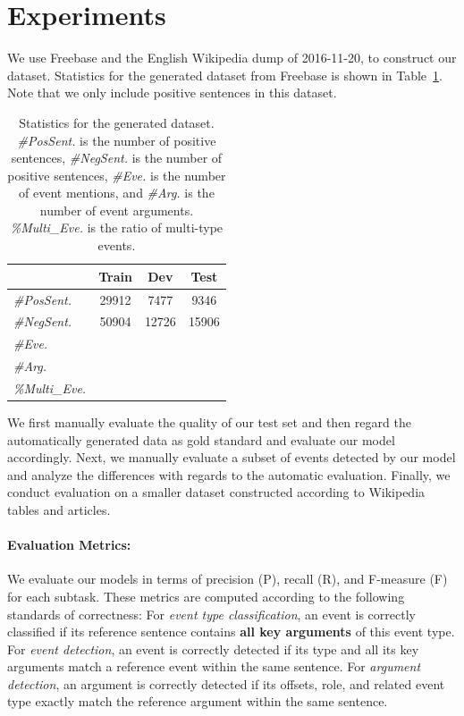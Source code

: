 \section{Experiments}
We use Freebase and the English Wikipedia dump of 2016-11-20, to construct our dataset. Statistics for the generated dataset from Freebase is shown in Table~\ref{statistics}. Note that we only include positive sentences in this dataset. 
\begin{table}
\small
\centering
\begin{tabular}{|l|c|c|c|} \hline
& Train & Dev & Test \\ \hline
\emph{\#PosSent.} & 29912 & 7477 & 9346 \\ \hline
\emph{\#NegSent.} & 50904 & 12726 & 15906  \\ \hline
\emph{\#Eve.} &  &  &  \\ \hline
\emph{\#Arg.} &  &  &  \\ \hline
\emph{\%Multi\_Eve.} &  &  &  \\ \hline
\end{tabular}
\caption{Statistics for the generated dataset. \emph{\#PosSent.} is the number of positive sentences, \emph{\#NegSent.} is the number of positive sentences, \emph{\#Eve.} is the number of event mentions, and \emph{\#Arg.} is the number of event arguments. \emph{\%Multi\_Eve.} is the ratio of multi-type events.
\label{statistics}}
\end{table}

We first manually evaluate the quality of our test set and then regard the automatically generated data as gold standard and evaluate our model accordingly. Next, we manually evaluate a subset of events detected by our model and analyze the differences with regards to the automatic evaluation. Finally, we conduct evaluation on a smaller dataset constructed according to Wikipedia tables and articles. 

\paragraph{Evaluation Metrics:} We evaluate our models in terms of precision (P), recall (R), and F-measure (F) for each subtask. These metrics are computed according to the following standards of correctness: 
For \emph{event type classification}, an event is correctly classified if its reference sentence contains \textbf{all key arguments} of this event type. 
For \emph{event detection}, an event is correctly detected if its type and all its key arguments match a reference event within the same sentence.
For \emph{argument detection}, an argument is correctly detected if its offsets, role, and related event type exactly match the reference argument within the same sentence. 

